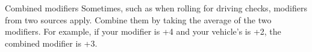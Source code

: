 
\begin{abstractsection}{Combined modifiers}
Sometimes, such as when rolling for driving checks, modifiers from two sources apply. Combine them by taking the average of the two modifiers. For example, if your  modifier is +4 and your vehicle's  is +2, the combined modifier is +3.
\end{abstractsection}
